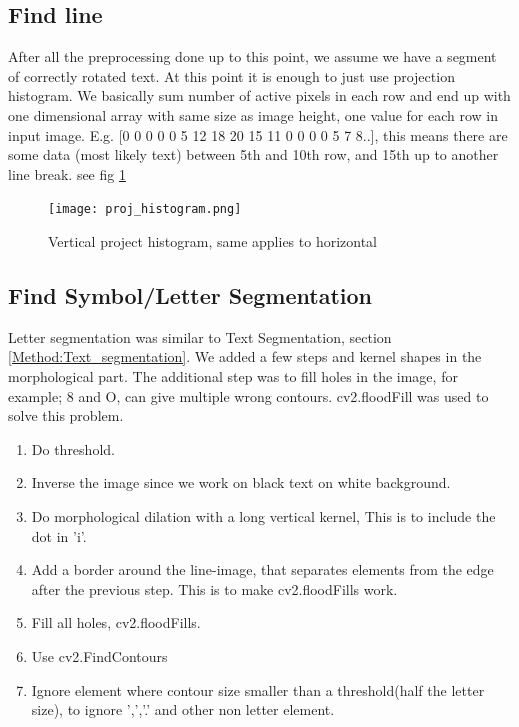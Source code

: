\documentclass[Report.tex]{subfiles}
\begin{document}
\subsection{Find line}\label{subsec:Find_line}
After all the preprocessing done up to this point, we assume we have a segment of correctly rotated text. At this point it is enough to just use projection histogram. We basically sum number of active pixels in each row and end up with one dimensional array with same size as image height, one value for each row in input image.
E.g. [0 0 0 0 0 5 12 18 20 15 11 0 0 0 0 5 7 8..], this means there are some data (most likely text) between 5th and 10th row, and 15th  up to another line break. see fig \ref{fig:Project_histogram}
\begin{figure}[H]
  \centering
  \texttt{[image: proj\_histogram.png]}
  \caption{Vertical project histogram, same applies to horizontal}
  \label{fig:Project_histogram}
\end{figure}


\subsection{Find Symbol/Letter Segmentation}\label{subsec:Find_Symb}
Letter segmentation was similar to Text Segmentation, section \ref{Method:Text_segmentation}. We added a few steps and kernel shapes in the morphological part. The additional step was to fill holes in the image, for example; 8 and O, can give multiple wrong contours. cv2.floodFill was used to solve this problem.
\begin{enumerate}
  \item Do threshold. 
  \item Inverse the image since we work on black text on white background.
  \item Do morphological dilation with a long vertical kernel, This is to include the dot in 'i'.
  \item Add a border around the line-image, that separates elements from the edge after the previous step. This is to make cv2.floodFills work.
  \item Fill all holes, cv2.floodFills.
  \item Use cv2.FindContours
  \item Ignore element where contour size smaller than a threshold(half the letter size), to ignore ',','.' and other non letter element.
\end{enumerate}
\end{document}
